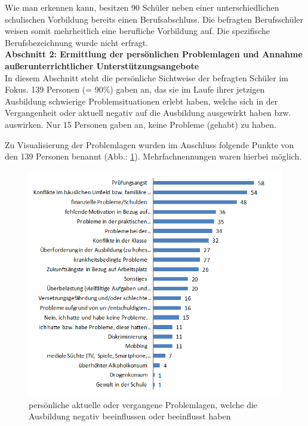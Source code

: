 \noindent
Wie man erkennen kann, besitzen 90 Schüler neben einer unterschiedlichen schulischen Vorbildung bereits einen Berufsabschluss. Die befragten Berufsschüler weisen somit mehrheitlich eine berufliche Vorbildung auf. Die spezifische Berufsbezeichnung wurde nicht erfragt.\\

\noindent
\textbf{Abschnitt 2: Ermittlung der persönlichen Problemlagen und Annahme außerunterrichtlicher Unterstützungsangebote}\\

\noindent
In diesem Abschnitt steht die persönliche Sichtweise der befragten Schüler im Fokus. 139 Personen (= 90\%) gaben an, das sie im Laufe ihrer jetzigen Ausbildung schwierige Problemsituationen erlebt haben, welche sich in der Vergangenheit oder aktuell negativ auf die Ausbildung ausgewirkt haben bzw. auswirken. Nur 15 Personen gaben an, keine Probleme (gehabt) zu haben. 

Zu Visualisierung der Problemlagen wurden im Anschluss folgende Punkte von den 139 Personen benannt (Abb.: \ref{fig:Aktuelle-oder-vergangene-Probleme-der-Schueler-welche-die-Ausbildung-negativ-beeinflussen-oder-negativ-beeinflusst-haben}). Mehrfachnennungen waren hierbei möglich.  

\begin{figure}[ht]
	\centering
		\includegraphics[width=1.0\textwidth]{images/Aktuelle-oder-vergangene-Probleme-der-Schueler-welche-die-Ausbildung-negativ-beeinflussen-oder-negativ-beeinflusst-haben.png}
	\caption{persönliche aktuelle oder vergangene Problemlagen, welche die Ausbildung negativ beeinflussen oder beeinflusst haben}
	\label{fig:Aktuelle-oder-vergangene-Probleme-der-Schueler-welche-die-Ausbildung-negativ-beeinflussen-oder-negativ-beeinflusst-haben}
\end{figure}

